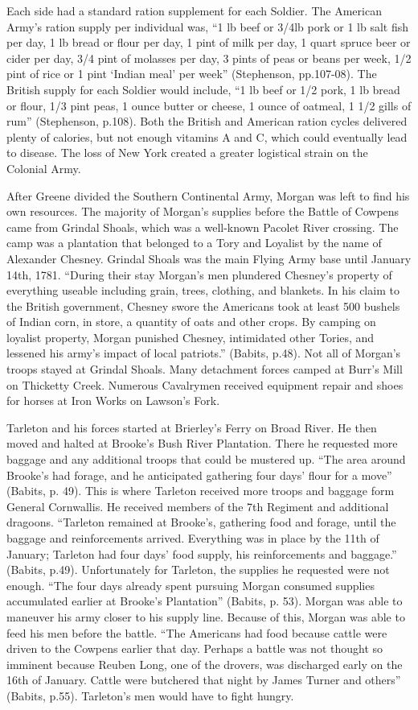 Each side had a standard ration supplement for each Soldier.  The American
Army’s ration supply per individual was, “1 lb beef or 3/4lb pork or 1 lb salt
fish per day, 1 lb bread or flour per day, 1 pint of milk per day, 1 quart
spruce beer or cider per day, 3/4 pint of molasses per day, 3 pints of peas or
beans per week, 1/2 pint of rice or 1 pint ‘Indian meal’ per week”
(Stephenson, pp.107-08).  The British supply for each Soldier would include, “1
lb beef or 1/2 pork, 1 lb bread or flour, 1/3 pint peas, 1 ounce butter or
cheese, 1 ounce of oatmeal, 1 1/2 gills of rum” (Stephenson, p.108).  Both the
British and American ration cycles delivered plenty of calories, but not enough
vitamins A and C, which could eventually lead to disease.  The loss of New York
created a greater logistical strain on the Colonial Army.

After Greene divided the Southern Continental Army, Morgan was left to find his
own resources.  The majority of Morgan’s supplies before the Battle of Cowpens
came from Grindal Shoals, which was a well-known Pacolet River crossing.  The
camp was a plantation that belonged to a Tory and Loyalist by the name of
Alexander Chesney.  Grindal Shoals was the main Flying Army base until January
14th, 1781.  “During their stay Morgan’s men plundered Chesney’s property of
everything useable including grain, trees, clothing, and blankets.  In his claim
to the British government, Chesney swore the Americans took at least 500 bushels
of Indian corn, in store, a quantity of oats and other crops.  By camping on
loyalist property, Morgan punished Chesney, intimidated other Tories, and
lessened his army’s impact of local patriots.” (Babits, p.48).  Not all of
Morgan’s troops stayed at Grindal Shoals.  Many detachment forces camped at
Burr’s Mill on Thicketty Creek.  Numerous Cavalrymen received equipment repair
and shoes for horses at Iron Works on Lawson’s Fork.

Tarleton and his forces started at Brierley’s Ferry on Broad River.  He then
moved and halted at Brooke’s Bush River Plantation.  There he requested more
baggage and any additional troops that could be mustered up.  “The area around
Brooke’s had forage, and he anticipated gathering four days’ flour for a move”
(Babits, p. 49).  This is where Tarleton received more troops and baggage form
General Cornwallis.  He received members of the 7th Regiment and additional
dragoons.  “Tarleton remained at Brooke’s, gathering food and forage, until the
baggage and reinforcements arrived. Everything was in place by the 11th of
January; Tarleton had four days’ food supply, his reinforcements and baggage.”
(Babits, p.49).  Unfortunately for Tarleton, the supplies he requested were not
enough.  “The four days already spent pursuing Morgan consumed supplies
accumulated earlier at Brooke’s Plantation” (Babits, p. 53).  Morgan was able to
maneuver his army closer to his supply line.  Because of this, Morgan was able
to feed his men before the battle.  “The Americans had food because cattle were
driven to the Cowpens earlier that day.  Perhaps a battle was not thought so
imminent because Reuben Long, one of the drovers, was discharged early on the
16th of January.  Cattle were butchered that night by James Turner and others”
(Babits, p.55).  Tarleton’s men would have to fight hungry.

